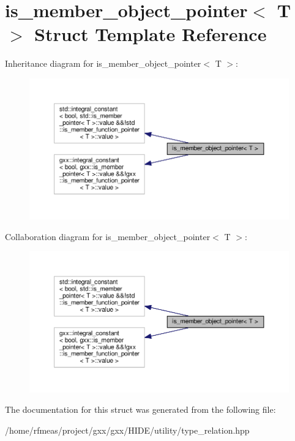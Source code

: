 \hypertarget{structis__member__object__pointer}{}\section{is\+\_\+member\+\_\+object\+\_\+pointer$<$ T $>$ Struct Template Reference}
\label{structis__member__object__pointer}


Inheritance diagram for is\+\_\+member\+\_\+object\+\_\+pointer$<$ T $>$\+:
\nopagebreak
\begin{figure}[H]
\begin{center}
\leavevmode
\includegraphics[width=350pt]{structis__member__object__pointer__inherit__graph}
\end{center}
\end{figure}


Collaboration diagram for is\+\_\+member\+\_\+object\+\_\+pointer$<$ T $>$\+:
\nopagebreak
\begin{figure}[H]
\begin{center}
\leavevmode
\includegraphics[width=350pt]{structis__member__object__pointer__coll__graph}
\end{center}
\end{figure}


The documentation for this struct was generated from the following file\+:\begin{DoxyCompactItemize}
\item 
/home/rfmeas/project/gxx/gxx/\+H\+I\+D\+E/utility/type\+\_\+relation.\+hpp\end{DoxyCompactItemize}
